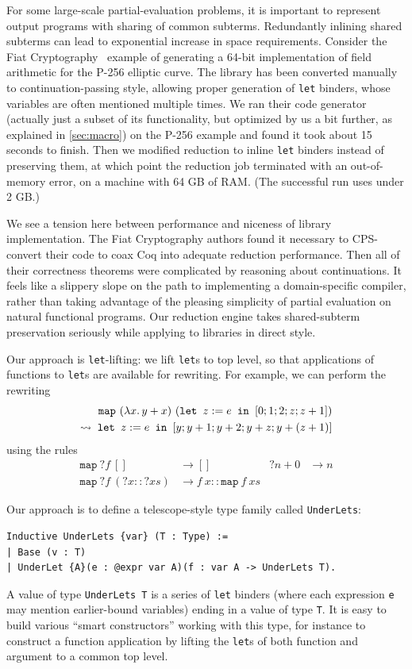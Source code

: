 For some large-scale partial-evaluation problems, it is important to represent output programs with sharing of common subterms.
Redundantly inlining shared subterms can lead to exponential increase in space requirements.
Consider the Fiat Cryptography~\cite{FiatCryptoSP19} example of generating a 64-bit implementation of field arithmetic for the P-256 elliptic curve.
The library has been converted manually to continuation-passing style, allowing proper generation of \texttt{let} binders, whose variables are often mentioned multiple times.
We ran their code generator (actually just a subset of its functionality, but optimized by us a bit further, as explained in \autoref{sec:macro}) on the P-256 example and found it took about 15 seconds to finish.
Then we modified reduction to inline \texttt{let} binders instead of preserving them, at which point the reduction job terminated with an out-of-memory error, on a machine with 64 GB of RAM.
(The successful run uses under 2 GB.)

We see a tension here between performance and niceness of library implementation.
The Fiat Cryptography authors found it necessary to CPS-convert their code to coax Coq into adequate reduction performance.
Then all of their correctness theorems were complicated by reasoning about continuations.
It feels like a slippery slope on the path to implementing a domain-specific compiler, rather than taking advantage of the pleasing simplicity of partial evaluation on natural functional programs.
Our reduction engine takes shared-subterm preservation seriously while applying to libraries in direct style.

Our approach is \texttt{let}-lifting: we lift \texttt{let}s to top level, so that applications of functions to \texttt{let}s are available for rewriting.
For example, we can perform the rewriting
\begin{align*}
  \texttt{map}\ (\lambda x.\, y+x)\ (\letin[{z:=e}{[0;1;2;z;z+1]}]) \\
  \leadsto \; \letin[{z:=e}{[y;y+1;y+2;y+z;y+(z+1)]}]
\end{align*}
using the rules
\begin{align*}
  \texttt{map}\ ?f\ [] & \to []
  & ?n + 0 & \to n \\
  \texttt{map}\ ?f\ (?x :: ?xs) & \to f\ x :: \texttt{map}\ f\ xs
\end{align*}

Our approach is to define a telescope-style type family called \texttt{UnderLets}:
\begin{verbatim}
Inductive UnderLets {var} (T : Type) :=
| Base (v : T)
| UnderLet {A}(e : @expr var A)(f : var A -> UnderLets T).
\end{verbatim}
A value of type \texttt{UnderLets T} is a series of \texttt{let} binders (where each expression \texttt{e} may mention earlier-bound variables) ending in a value of type \texttt{T}.
It is easy to build various ``smart constructors'' working with this type, for instance to construct a function application by lifting the \texttt{let}s of both function and argument to a common top level.


